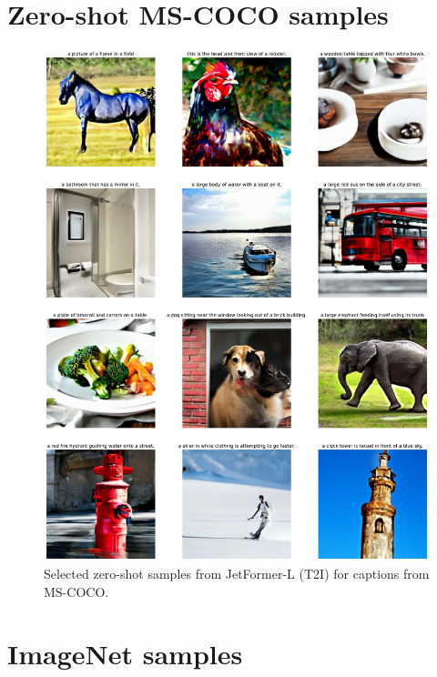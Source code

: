 \documentclass{article} %
\newcommand{\name}{JetFormer\xspace}
\begin{document}
\newpage
\section{Zero-shot MS-COCO samples}
\label{app:coco-samples}
\begin{figure}[h]
\centering
\includegraphics[width=0.85\columnwidth]{figures/coco_samples_1p3b.pdf}
\caption{Selected zero-shot samples from \name-L (T2I) for captions from MS-COCO.}
\label{fig:coco_samples}
\end{figure}

\newpage
\section{ImageNet samples}
\label{app:imagenet-samples}
\end{document}
